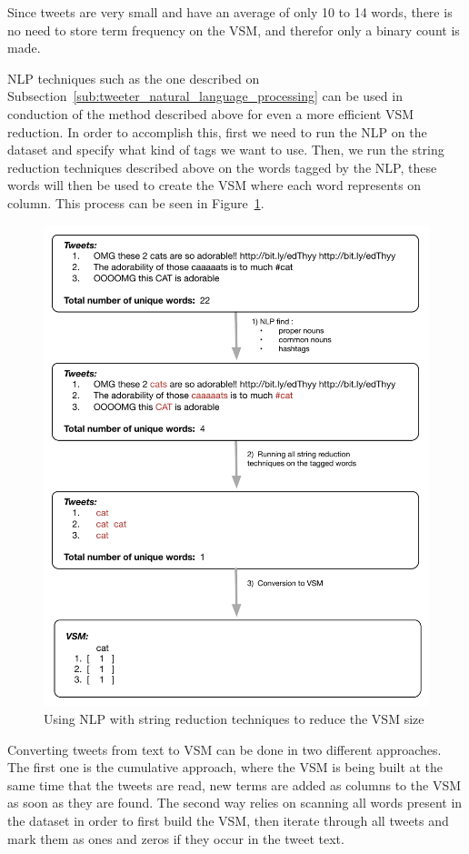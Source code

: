 \documentclass[journal]{IEEEtran}
\begin{document}
Since tweets are very small and have an average of only 10 to 14 words, there is no need to store term frequency on the \ac{VSM}, and therefor only a binary count is made.

\ac{NLP} techniques such as the one described on Subsection~\ref{sub:tweeter_natural_language_processing} can be used in conduction of the method described above for even a more efficient \ac{VSM} reduction. In order to accomplish this, first we need to run the \ac{NLP} on the dataset and specify what kind of tags we want to use. Then, we run the string reduction techniques described above on the words tagged by the \ac{NLP}, these words will then be used to create the \ac{VSM} where each word represents on column. This process can be seen in Figure~\ref{fig:string_nlp}.
\begin{figure}[htpb]
  \centering
  \includegraphics[width=0.8\linewidth]{./images/string_reduction_nlp.pdf}
  \caption{Using NLP with string reduction techniques to reduce the VSM size}
  \label{fig:string_nlp}
\end{figure}

Converting tweets from text to \ac{VSM} can be done in two different approaches. The first one is the cumulative approach, where the \ac{VSM} is being built at the same time that the tweets are read, new terms are added as columns to the \ac{VSM} as soon as they are found. The second way relies on scanning all words present in the dataset in order to first build the \ac{VSM}, then iterate through all tweets and mark them as ones and zeros if they occur in the tweet text. 
\end{document}
